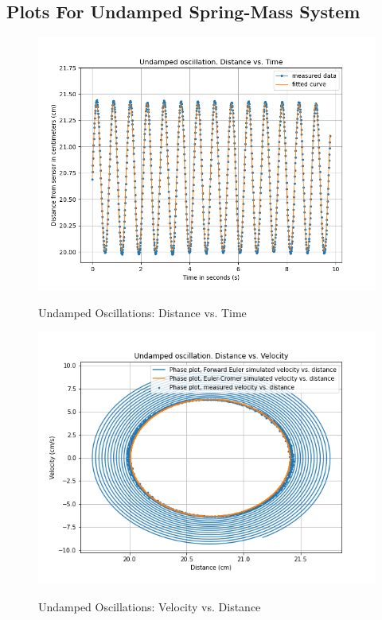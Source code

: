 \documentclass[letterpaper,12pt]{article}
\begin{document}
\subsection{Plots For Undamped Spring-Mass  System}
\begin{figure}[H]
  \centering
  \includegraphics[width=0.95\linewidth]{../Fredrik/Undamped oscillation. Distance vs. Time.png}    
  \begin{center}
    \emph{}
  \end{center}
  \caption{Undamped Oscillations: Distance vs. Time}
  \label{undamped-plot}
\end{figure}

\begin{figure}[H]
  \centering
  \includegraphics[width=0.95\linewidth]{../Fredrik/Undamped oscillation. Distance vs. Velocity.png}    
  \begin{center}
    \emph{}
  \end{center}
  \caption{Undamped Oscillations: Velocity vs. Distance}
  \label{undamped-plot}
\end{figure}
\end{document}
